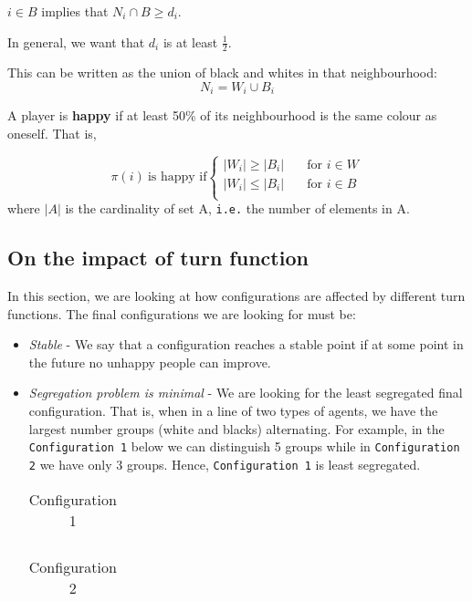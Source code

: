 \documentclass[../main.tex]{subfiles}
\begin{document}
$ i\in B$ implies that $N_i \cap B \geq d_i$.

 In general, we want that $d_i$ is at least $\frac{1}{2}$.

This can be written as the union of black and whites in that neighbourhood:
\[ N_i = W_i \cup B_i \]

A player is \textbf{happy} if at least 50\% of its neighbourhood is the same colour as oneself. That is,

\[ \pi(i)\ \text{is happy if}
  \begin{cases}
    |W_i| \geq |B_i|      & \quad \text{for } i \in W\\
    |W_i| \leq |B_i|      & \quad \text{for } i \in B\\
  \end{cases}
\] where $|A|$ is the cardinality of set A, \verb|i.e.| the number of elements in A.

\subsection{On the impact of turn function}
In this section, we are looking at how configurations are affected by different turn functions. The final configurations we are looking for must be:

\begin{itemize}
    \item \textit{Stable} - We say that a configuration reaches a stable point if at some point in the future no unhappy people can improve.
    \item \textit{Segregation problem is minimal} - We are looking for the least segregated final configuration. That is, when in a line of two types of agents, we have the largest number groups (white and blacks) alternating. For example, in the \verb|Configuration 1| below we can distinguish 5 groups while in \verb|Configuration 2| we have only 3 groups. Hence, \verb|Configuration 1| is least segregated. 
    \begin{table}[H]
    \begin{center}
    {\begin{tabular}{| c |c| c| c| c |c| c |c| c |c|c|c|c|c|c|c|}
    \hline
    \x &\x &\x &\z &\z &\z  &\z &\x &\x & \z &\z & \z& \x&\x&\x&\x\\
     \hline
    \end{tabular}}
    \end{center}
    \caption*{Configuration 1}
    \end{table}
    
    \begin{table}[H]
    \begin{center}
    {\begin{tabular}{| c |c| c| c| c |c| c |c| c |c|c|c|c|c|c|c|}
    \hline
    \x &\x &\x &\x &\z &\z  &\z &\z &\z & \z &\z & \x& \x&\x&\x&\x\\
     \hline
    \end{tabular}}
    \end{center}
    \caption*{Configuration 2}
    \end{table}
\end{itemize}
\end{document}
